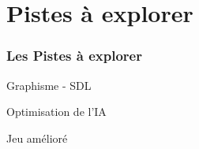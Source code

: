 \section{Pistes à explorer}
	\frametitle{\textbf{Les Pistes à explorer}}
	\begin{frame}
		\item Graphisme - SDL
		\item Optimisation de l'IA
		\item Jeu amélioré
	\end{frame}